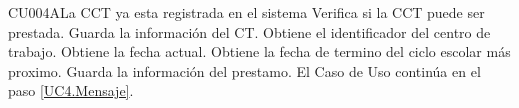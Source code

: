 \begin{UCtrayectoriaA}{CU004}{A}{La CCT ya esta registrada en el sistema}
	\UCpaso Verifica si la CCT puede ser prestada. 
    \UCpaso Guarda la información del CT.
    \UCpaso Obtiene el identificador del centro de trabajo.
    \UCpaso Obtiene la fecha actual.
    \UCpaso Obtiene la fecha de termino del ciclo escolar más proximo.
    \UCpaso Guarda la información del prestamo. 
	\UCpaso[] El Caso de Uso continúa en el paso \ref{UC4.Mensaje}.
\end{UCtrayectoriaA}




		
		
		
